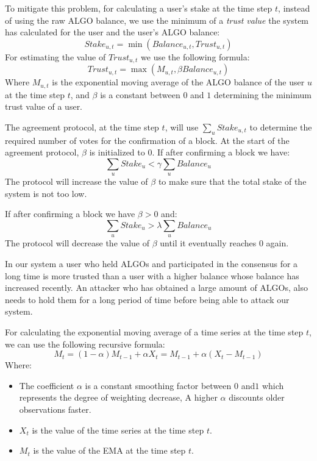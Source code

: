 \documentclass[11pt, A4]{report}
\begin{document}
    To mitigate this problem, for calculating a user's stake at the time step \(t\), instead of using the raw ALGO
    balance, we use the minimum of a \emph{trust value} the system has calculated for the user and the user's
    ALGO balance:
    \[
        Stake_{u,t} = \min (Balance_{u,t}, Trust_{u,t})
    \]
    For estimating the value of \(Trust_{u,t}\) we use the following formula:
    \[
        Trust_{u,t} = \max (M_{u,t}, \beta Balance_{u,t})
    \]
    Where \(M_{u,t}\) is the exponential moving average of the ALGO balance of the user \(u\) at the time step \(t\),
    and \(\beta\) is a constant between \(0\) and \(1\) determining the minimum trust value of a user.

    The agreement protocol, at the time step \(t\), will use \(\sum_{u}Stake_{u,t}\) to determine the required number of
    votes for the confirmation of a block. At the start of the agreement protocol, \(\beta\) is initialized to \(0\).
    If after confirming a block we have:
    \[
        \sum_{u}Stake_u < \gamma \sum_{u} Balance_u
    \]
    The protocol will increase the value of \(\beta\) to make sure that the total stake of the system is not too low.

    If after confirming a block we have \(\beta > 0\) and:
    \[
        \sum_{u}Stake_u > \lambda \sum_{u} Balance_u
    \]
    The protocol will decrease the value of \(\beta\) until it eventually reaches \(0\) again.

    In our system a user who held ALGOs and participated in the consensus for a long time is more trusted
    than a user with a higher balance whose balance has increased recently. An attacker who has obtained a large
    amount of ALGOs, also needs to hold them for a long period of time before being able to attack our system.

    For calculating the exponential moving average of a time series at the time step \(t\), we can use the following
    recursive formula:
    \[
        M_t = (1 - \alpha) M_{t-1} + \alpha X_t = M_{t-1} + \alpha (X_t - M_{t-1})
    \]
    Where:
    \begin{itemize}
        \item The coefficient \(\alpha\) is a constant smoothing factor between \(0\) and\(1\) which represents the
        degree of weighting decrease, A higher \(\alpha\) discounts older observations faster.
        \item \(X_t\) is the value of the time series at the time step \(t\).
        \item \(M_t\) is the value of the EMA at the time step \(t\).
    \end{itemize}
\end{document}
